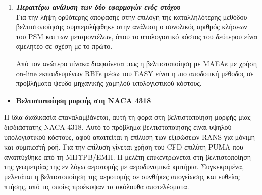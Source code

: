 \documentclass[twoside, 12pt,notitlepage]{report}
\begin{document}
\begin{enumerate}
\newpage


\item \textbf{\textit{Περαιτέρω ανάλυση των δύο εφαρμογών ενός 
στόχου}} \\
Για την λήψη ορθότερης απόφασης στην επιλογή της καταλληλότερης 
μεθόδου βελτιστοποίησης συμπεριλήφθηκε στην ανάλυση ο συνολικός 
αριθμός κλήσεων του PSM και των μεταμοντέλων, όπου το υπολογιστικό 
κόστος του δεύτερου είναι αμελητέο σε σχέση με το πρώτο.

\begin{table}[h!]
\centering
\caption{Σύγκριση μεταξύ των τελικών αποτελεσμάτων}
\end{table}

Από τον ανώτερο πίνακα διαφαίνεται πως η βελτιστοποίηση με MAEAs 
με χρήση on-line εκπαιδευμένων RBFs μέσω του EASY είναι η πιο 
αποδοτική μέθοδος σε προβλήματα ψευδο-μηχανικής χαμηλού 
υπολογιστικού κόστους.
\end{enumerate}


\vspace{0.5cm}

\begin{itemize}
\item \textbf{Βελτιστοποίηση μορφής στη NACA 4318}
\end{itemize}

Η ίδια διαδικασία επαναλαμβάνεται, αυτή τη φορά στη βελτιστοποίηση 
μορφής μιας δισδιάστατης NACA 4318. Αυτό το πρόβλημα 
βελτιστοποίησης είναι υψηλού υπολογιστικού κόστους, αφού απαιτείται 
η επίλυση των εξισώσεων RANS για μόνιμη και συμπιεστή ροή. Για την 
επίλυση γίνεται χρήση του CFD επιλύτη PUMA που αναπτύχθηκε από τη
ΜΠΥΡΒ/ΕΜΠ. Η μελέτη επικεντρώνεται στη  βελτιστοποίηση της 
γεωμετρίας της εν λόγω αεροτομής με αεροδυναμικά κριτήρια. 
Συγκεκριμένα, μελετάται η βελτιστοποίηση της αεροτομής σε συνθήκες 
απογείωσης και ευθείας πτήσης, από τις οποίες προέκυψαν τα ακόλουθα
αποτελέσματα.    
\end{document}
